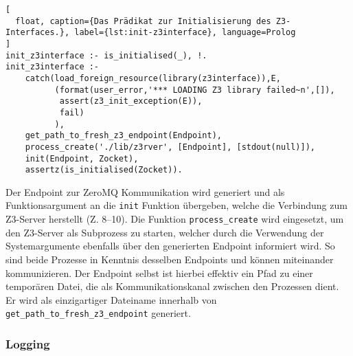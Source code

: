 \begin{lstlisting}[
  float, caption={Das Prädikat zur Initialisierung des Z3-Interfaces.}, label={lst:init-z3interface}, language=Prolog
]
init_z3interface :- is_initialised(_), !.
init_z3interface :-
    catch(load_foreign_resource(library(z3interface)),E,
          (format(user_error,'*** LOADING Z3 library failed~n',[]),
           assert(z3_init_exception(E)),
           fail)
          ),
    get_path_to_fresh_z3_endpoint(Endpoint),
    process_create('./lib/z3rver', [Endpoint], [stdout(null)]),
    init(Endpoint, Zocket),
    assertz(is_initialised(Zocket)).
\end{lstlisting}

Der Endpoint zur ZeroMQ Kommunikation wird generiert
und als Funktionsargument an die \texttt{init} Funktion übergeben, welche die Verbindung zum Z3-Server herstellt (Z. 8--10).
Die Funktion \texttt{process\_create} wird eingesetzt, um den Z3-Server als Subprozess zu starten,
welcher durch die Verwendung der Systemargumente ebenfalls über den generierten Endpoint informiert wird.
So sind beide Prozesse in Kenntnis desselben Endpoints und können miteinander kommunizieren.
Der Endpoint selbst ist hierbei effektiv ein Pfad zu einer temporären Datei, die als Kommunikationskanal zwischen den Prozessen dient.
Er wird als einzigartiger Dateiname innerhalb von \texttt{get\_path\_to\_fresh\_z3\_endpoint} generiert.

\subsubsection{Logging}
\label{subsec:logging}

